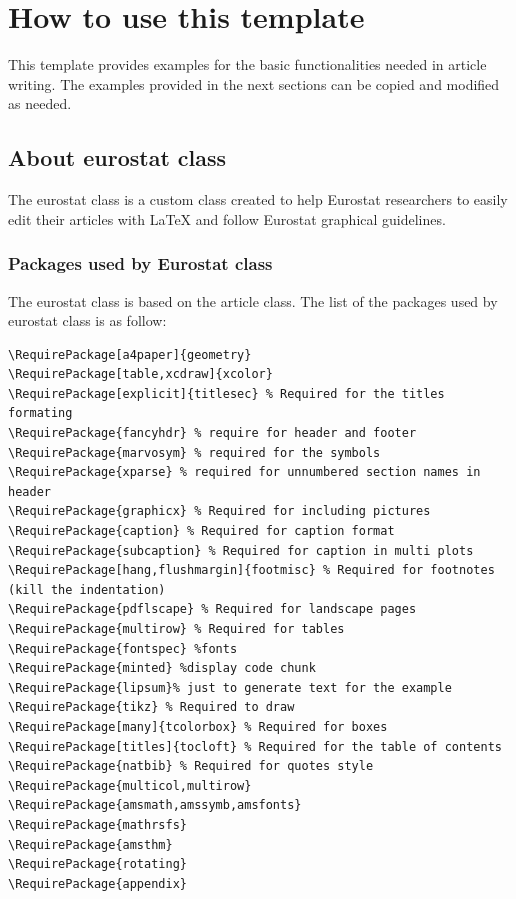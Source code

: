 \documentclass[Theme1]{{template_material/eurostat}}
\begin{document}

\section{How to use this template}

This template provides examples for the basic functionalities needed in article writing. The examples provided in the next sections can be copied and modified as needed.

\subsection{About eurostat class}

The eurostat class is a custom class created to help Eurostat researchers to easily edit their articles with LaTeX and follow Eurostat graphical guidelines. 

\subsubsection{Packages used by Eurostat class}

The eurostat class is based on the article class. The list of the packages used by eurostat class is as follow:
\begin{verbatim}
\RequirePackage[a4paper]{geometry}
\RequirePackage[table,xcdraw]{xcolor}
\RequirePackage[explicit]{titlesec} % Required for the titles formating
\RequirePackage{fancyhdr} % require for header and footer
\RequirePackage{marvosym} % required for the symbols 
\RequirePackage{xparse} % required for unnumbered section names in header
\RequirePackage{graphicx} % Required for including pictures
\RequirePackage{caption} % Required for caption format
\RequirePackage{subcaption} % Required for caption in multi plots
\RequirePackage[hang,flushmargin]{footmisc} % Required for footnotes (kill the indentation)
\RequirePackage{pdflscape} % Required for landscape pages
\RequirePackage{multirow} % Required for tables
\RequirePackage{fontspec} %fonts
\RequirePackage{minted} %display code chunk
\RequirePackage{lipsum}% just to generate text for the example
\RequirePackage{tikz} % Required to draw 
\RequirePackage[many]{tcolorbox} % Required for boxes
\RequirePackage[titles]{tocloft} % Required for the table of contents
\RequirePackage{natbib} % Required for quotes style
\RequirePackage{multicol,multirow}
\RequirePackage{amsmath,amssymb,amsfonts}
\RequirePackage{mathrsfs}
\RequirePackage{amsthm}
\RequirePackage{rotating}
\RequirePackage{appendix}
\end{verbatim}
\end{document}
